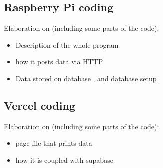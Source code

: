 \subsection{Raspberry Pi coding}
{
Elaboration on (including some parts of the code):
\begin{itemize}
\item Description of the whole program
\item how it posts data via HTTP
\item Data stored on database , and database setup
\end{itemize}
}

\subsection{Vercel coding}
{
Elaboration on (including some parts of the code):
\begin{itemize}
\item page file that prints data
\item how it is coupled with supabase
\end{itemize}
}
